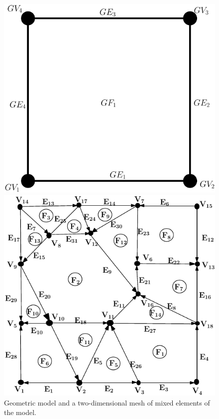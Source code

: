 \documentclass[12pt]{article}
\begin{document}
\begin{figure}[!h]
  \begin{center}
    \begin{minipage}{0.5\textwidth}
      \begin{center}
        \includegraphics[scale=0.85]{figures/examplemodel}
      \end{center}
    \end{minipage}%
    \begin{minipage}{0.5\textwidth}
      \begin{center}
        \includegraphics[scale=0.85]{figures/examplemesh}
      \end{center}
    \end{minipage}
  \end{center}
  \caption{Geometric model and a two-dimensional mesh of mixed elements of the model.}
\end{figure}
\end{document}
